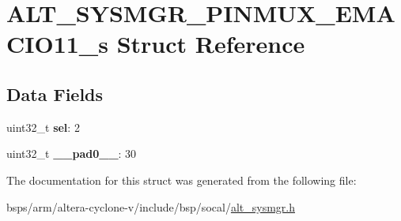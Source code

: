 \hypertarget{structALT__SYSMGR__PINMUX__EMACIO11__s}{}\section{A\+L\+T\+\_\+\+S\+Y\+S\+M\+G\+R\+\_\+\+P\+I\+N\+M\+U\+X\+\_\+\+E\+M\+A\+C\+I\+O11\+\_\+s Struct Reference}
\label{structALT__SYSMGR__PINMUX__EMACIO11__s}
\subsection*{Data Fields}
\begin{DoxyCompactItemize}
\item 
\mbox{\label{structALT__SYSMGR__PINMUX__EMACIO11__s_ab93cd53b0e87b03764e24c9e606d34aa}} 
uint32\+\_\+t {\bfseries sel}\+: 2
\item 
\mbox{\label{structALT__SYSMGR__PINMUX__EMACIO11__s_acf9a8a553ad6d4bb6de8cf0197b20d57}} 
uint32\+\_\+t {\bfseries \+\_\+\+\_\+pad0\+\_\+\+\_\+}\+: 30
\end{DoxyCompactItemize}


The documentation for this struct was generated from the following file\+:\begin{DoxyCompactItemize}
\item 
bsps/arm/altera-\/cyclone-\/v/include/bsp/socal/\mbox{\hyperlink{alt__sysmgr_8h}{alt\+\_\+sysmgr.\+h}}\end{DoxyCompactItemize}
